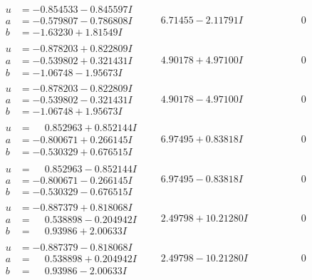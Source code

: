 \documentclass[1p]{elsarticle_modified}
\theoremstyle{definition}
\begin{document}
$$\begin{array}{c|c|c}
\begin{aligned}
u &= -0.854533 - 0.845597 I \\
a &= -0.579807 - 0.786808 I \\
b &= -1.63230 + 1.81549 I\end{aligned}
 & \phantom{-}6.71455 - 2.11791 I & \phantom{-0.000000 } 0 \\ \hline\begin{aligned}
u &= -0.878203 + 0.822809 I \\
a &= -0.539802 + 0.321431 I \\
b &= -1.06748 - 1.95673 I\end{aligned}
 & \phantom{-}4.90178 + 4.97100 I & \phantom{-0.000000 } 0 \\ \hline\begin{aligned}
u &= -0.878203 - 0.822809 I \\
a &= -0.539802 - 0.321431 I \\
b &= -1.06748 + 1.95673 I\end{aligned}
 & \phantom{-}4.90178 - 4.97100 I & \phantom{-0.000000 } 0 \\ \hline\begin{aligned}
u &= \phantom{-}0.852963 + 0.852144 I \\
a &= -0.800671 + 0.266145 I \\
b &= -0.530329 + 0.676515 I\end{aligned}
 & \phantom{-}6.97495 + 0.83818 I & \phantom{-0.000000 } 0 \\ \hline\begin{aligned}
u &= \phantom{-}0.852963 - 0.852144 I \\
a &= -0.800671 - 0.266145 I \\
b &= -0.530329 - 0.676515 I\end{aligned}
 & \phantom{-}6.97495 - 0.83818 I & \phantom{-0.000000 } 0 \\ \hline\begin{aligned}
u &= -0.887379 + 0.818068 I \\
a &= \phantom{-}0.538898 - 0.204942 I \\
b &= \phantom{-}0.93986 + 2.00633 I\end{aligned}
 & \phantom{-}2.49798 + 10.21280 I & \phantom{-0.000000 } 0 \\ \hline\begin{aligned}
u &= -0.887379 - 0.818068 I \\
a &= \phantom{-}0.538898 + 0.204942 I \\
b &= \phantom{-}0.93986 - 2.00633 I\end{aligned}
 & \phantom{-}2.49798 - 10.21280 I & \phantom{-0.000000 } 0\\

\end{array}$$
\end{document}
